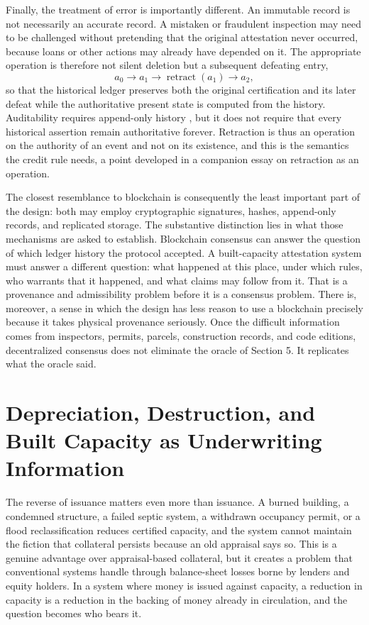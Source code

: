 \documentclass[11pt]{article}
\theoremstyle{definition}
\begin{document}
Finally, the treatment of error is importantly different. An immutable record is not necessarily an accurate record. A mistaken or fraudulent inspection may need to be challenged without pretending that the original attestation never occurred, because loans or other actions may already have depended on it. The appropriate operation is therefore not silent deletion but a subsequent defeating entry,
\begin{equation}
a_0\longrightarrow a_1\longrightarrow\operatorname{retract}(a_1)\longrightarrow a_2,
\label{eq:retract}
\end{equation}
so that the historical ledger preserves both the original certification and its later defeat while the authoritative present state is computed from the history. Auditability requires append-only history \cite{helland2015}, but it does not require that every historical assertion remain authoritative forever. Retraction is thus an operation on the authority of an event and not on its existence, and this is the semantics the credit rule needs, a point developed in a companion essay on retraction as an operation.

The closest resemblance to blockchain is consequently the least important part of the design: both may employ cryptographic signatures, hashes, append-only records, and replicated storage. The substantive distinction lies in what those mechanisms are asked to establish. Blockchain consensus can answer the question of which ledger history the protocol accepted. A built-capacity attestation system must answer a different question: what happened at this place, under which rules, who warrants that it happened, and what claims may follow from it. That is a provenance and admissibility problem before it is a consensus problem. There is, moreover, a sense in which the design has less reason to use a blockchain precisely because it takes physical provenance seriously. Once the difficult information comes from inspectors, permits, parcels, construction records, and code editions, decentralized consensus does not eliminate the oracle of Section 5. It replicates what the oracle said.

\section{Depreciation, Destruction, and Built Capacity as Underwriting Information}

The reverse of issuance matters even more than issuance. A burned building, a condemned structure, a failed septic system, a withdrawn occupancy permit, or a flood reclassification reduces certified capacity, and the system cannot maintain the fiction that collateral persists because an old appraisal says so. This is a genuine advantage over appraisal-based collateral, but it creates a problem that conventional systems handle through balance-sheet losses borne by lenders and equity holders. In a system where money is issued against capacity, a reduction in capacity is a reduction in the backing of money already in circulation, and the question becomes who bears it.
\end{document}
